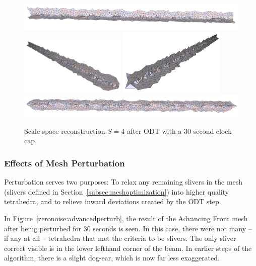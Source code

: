 \documentclass[12pt]{drexelthesis}
\let\Oldsubsubsection\subsubsection
\renewcommand{\subsubsection}{\FloatBarrier\Oldsubsubsection}
\begin{document}
\begin{figure}[!ht]
	\centering
		\includegraphics[width=5in]{simulated-lab-scan/0noise/optimizedNeat/scalespace4odt00.png}
		\includegraphics[width=2in]{simulated-lab-scan/0noise/optimizedNeat/scalespace4odt01.png}
		\includegraphics[width=2in]{simulated-lab-scan/0noise/optimizedNeat/scalespace4odt02.png}
		\includegraphics[width=5in]{simulated-lab-scan/0noise/optimizedNeat/scalespace4odt03.png}
		\caption[Scale space reconstruction $S = 4$ after ODT with a 30 second clock cap]{\centering Scale space reconstruction $S = 4$ after ODT with a 30 second clock cap.}
	\label{zeronoise:scalespace4odt}
\end{figure}

\subsubsection{Effects of Mesh Perturbation}

Perturbation serves two purposes: To relax any remaining slivers in the mesh (slivers defined in Section~\ref{subsec:meshoptimization}) into higher quality tetrahedra, and to relieve inward deviations created by the ODT step.

In Figure~\ref{zeronoise:advancedperturb}, the result of the Advancing Front mesh after being perturbed for 30 seconds is seen. In this case, there were not many -- if any at all -- tetrahedra that met the criteria to be slivers. The only sliver correct visible is in the lower lefthand corner of the beam. In earlier steps of the algorithm, there is a slight dog-ear, which is now far less exaggerated.
\end{document}
